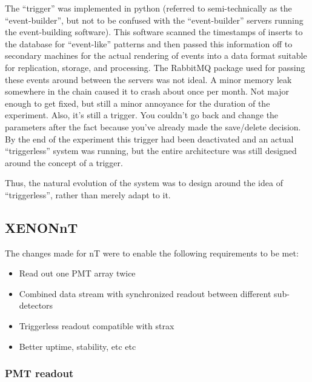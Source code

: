 The ``trigger'' was implemented in python (referred to semi-technically as the ``event-builder'', but not to be confused with the ``event-builder'' servers running the event-building software).
This software scanned the timestamps of inserts to the database for ``event-like'' patterns and then passed this information off to secondary machines for the actual rendering of events into a data format suitable for replication, storage, and processing.
The RabbitMQ package used for passing these events around between the servers was not ideal.
A minor memory leak somewhere in the chain caused it to crash about once per month.
Not major enough to get fixed, but still a minor annoyance for the duration of the experiment.
Also, it's still a trigger.
You couldn't go back and change the parameters after the fact because you've already made the save/delete decision.
By the end of the experiment this trigger had been deactivated and an actual ``triggerless'' system was running, but the entire architecture was still designed around the concept of a trigger.

Thus, the natural evolution of the system was to design around the idea of ``triggerless'', rather than merely adapt to it.

\subsection{XENONnT}

The changes made for nT were to enable the following requirements to be met:
\begin{itemize}
  \item Read out one PMT array twice
  \item Combined data stream with synchronized readout between different sub-detectors
  \item Triggerless readout compatible with strax
  \item Better uptime, stability, etc etc
\end{itemize}

\subsubsection{PMT readout}

